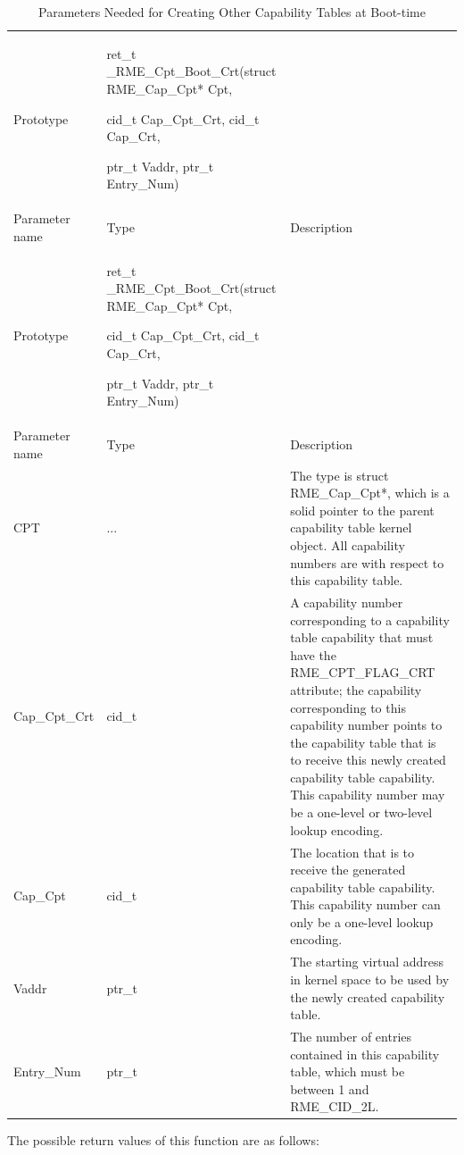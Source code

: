 \begin{xltabular}{\textwidth}{@{}>{\hsize\raggedright\arraybackslash}X>{\hsize\raggedright\arraybackslash}X>{\hsize\raggedright\arraybackslash}X@{}}
\caption{Parameters Needed for Creating Other Capability Tables at Boot-time}\label{tab:7-43-create-other-capability-tables-at-boot-parameters}\\
\toprule
Prototype\strut
 & ret\_t \_RME\_Cpt\_Boot\_Crt(struct RME\_Cap\_Cpt* Cpt,

cid\_t Cap\_Cpt\_Crt, cid\_t Cap\_Crt,

ptr\_t Vaddr, ptr\_t Entry\_Num)\strut
 & \strut
\tabularnewline
Parameter name & Type & Description\tabularnewline
\endfirsthead
\toprule
Prototype\strut
 & ret\_t \_RME\_Cpt\_Boot\_Crt(struct RME\_Cap\_Cpt* Cpt,

cid\_t Cap\_Cpt\_Crt, cid\_t Cap\_Crt,

ptr\_t Vaddr, ptr\_t Entry\_Num)\strut
 & \strut
\tabularnewline
Parameter name & Type & Description\tabularnewline
\midrule
\endhead
\bottomrule
\endlastfoot
CPT & ... &
The type is struct RME\_Cap\_Cpt*, which is a solid pointer to the parent capability table kernel object. All capability numbers are with respect to this capability table.\tabularnewline
Cap\_Cpt\_Crt & cid\_t &
A capability number corresponding to a capability table capability that must have the RME\_CPT\_FLAG\_CRT attribute; the capability corresponding to this capability number points to the capability table that is to receive this newly created capability table capability. This capability number may be a one-level or two-level lookup encoding.\tabularnewline
Cap\_Cpt & cid\_t &
The location that is to receive the generated capability table capability. This capability number can only be a one-level lookup encoding.\tabularnewline
Vaddr & ptr\_t &
The starting virtual address in kernel space to be used by the newly created capability table.\tabularnewline
Entry\_Num & ptr\_t &
The number of entries contained in this capability table, which must be between 1 and RME\_CID\_2L.\tabularnewline
\end{xltabular}
\nopagebreak[4]

The possible return values of this function are as follows:

